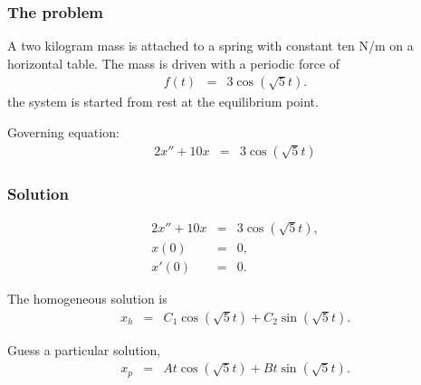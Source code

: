 \begin{frame}
  \frametitle{The problem}      
                                
  A two kilogram mass is attached to a spring with constant ten N/m on
  a horizontal table. The mass is driven with a periodic force of
  \begin{eqnarray*}
    f(t) & = & 3 \cos(\sqrt{5} t).
  \end{eqnarray*}
  the system is started from rest at the equilibrium point.

  Governing equation:
  \begin{eqnarray*}
    2 x'' + 10 x & = & 3 \cos(\sqrt{5} t)
  \end{eqnarray*}

\end{frame}


\begin{frame}
  \frametitle{Solution}

  \begin{eqnarray*}
    2 x'' + 10 x & = & 3 \cos(\sqrt{5} t), \\
    x(0) & = & 0, \\
    x'(0) & = & 0.
  \end{eqnarray*}

  The homogeneous solution is 
  \begin{eqnarray*}
    x_h & = & C_1 \cos(\sqrt{5} t) + C_2 \sin(\sqrt{5} t).
  \end{eqnarray*}

  {
    Guess a particular solution,
    \begin{eqnarray*}
      x_p & = & A t \cos(\sqrt{5} t) + B t \sin(\sqrt{5} t).
    \end{eqnarray*}
  }

\end{frame}

